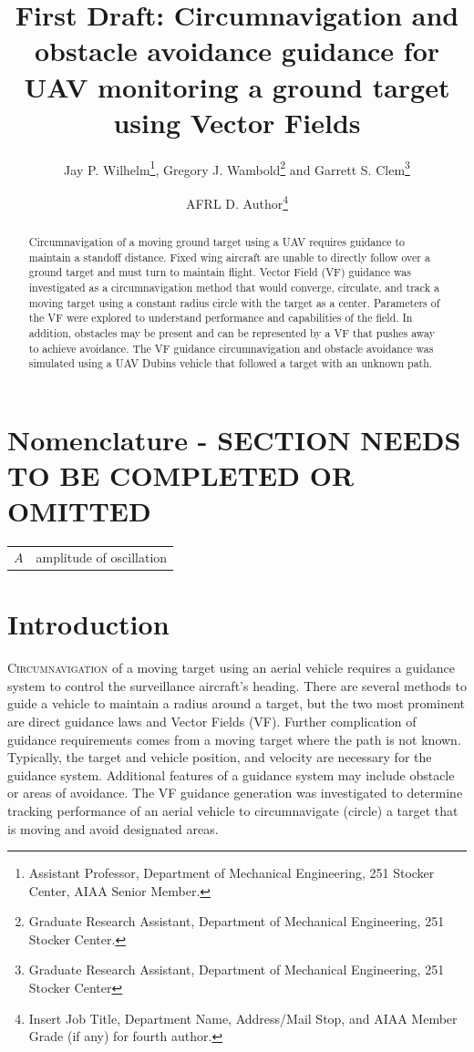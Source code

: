 \documentclass[conf]{new-aiaa}
\title{First Draft: Circumnavigation and obstacle avoidance guidance for UAV monitoring a ground target using Vector Fields}
\author{Jay P. Wilhelm\footnote{Assistant Professor, Department of Mechanical Engineering, 251 Stocker Center, AIAA Senior Member.}, Gregory J. Wambold\footnote{Graduate Research Assistant, Department of Mechanical Engineering, 251 Stocker Center.} and Garrett S. Clem\footnote{Graduate Research Assistant, Department of Mechanical Engineering, 251 Stocker Center}}
\affil{Ohio University, Athens, OH, 45701}
\author{AFRL D. Author\footnote{Insert Job Title, Department Name, Address/Mail Stop, and AIAA Member Grade (if any) for fourth author.}}
\affil{Business or Academic Affiliation 2, City, Province, Zip Code, Country}
\begin{document}
\maketitle

\begin{abstract}
Circumnavigation of a moving ground target using a UAV requires guidance to maintain a standoff distance. Fixed wing aircraft are unable to directly follow over a ground target and must turn to maintain flight. Vector Field (VF) guidance was investigated as a circumnavigation method that would converge, circulate, and track a moving target using a constant radius circle with the target as a center. Parameters of the VF were explored to understand performance and capabilities of the field. In addition, obstacles may be present and can be represented by a VF that pushes away to achieve avoidance. The VF guidance circumnavigation and obstacle avoidance was simulated using a UAV Dubins vehicle that followed a target with an unknown path.
\end{abstract}

\section{Nomenclature - SECTION NEEDS TO BE COMPLETED OR OMITTED}

{\renewcommand\arraystretch{1.0}
\noindent\begin{longtable*}{@{}l @{\quad=\quad} l@{}}
$A$  & amplitude of oscillation \\

\end{longtable*}}

\section{Introduction}
\lettrine{C}{ircumnavigation} of a moving target using an aerial vehicle requires a guidance system to control the surveillance aircraft's heading. There are several methods to guide a vehicle to maintain a radius around a target, but the two most prominent are direct guidance laws and Vector Fields (VF). Further complication of guidance requirements comes from a moving target where the path is not known. Typically, the target and vehicle position, and velocity are necessary for the guidance system. Additional features of a guidance system may include obstacle or areas of avoidance. The VF guidance generation was investigated to determine tracking performance of an aerial vehicle to circumnavigate (circle) a target that is moving and avoid designated areas.
\end{document}
